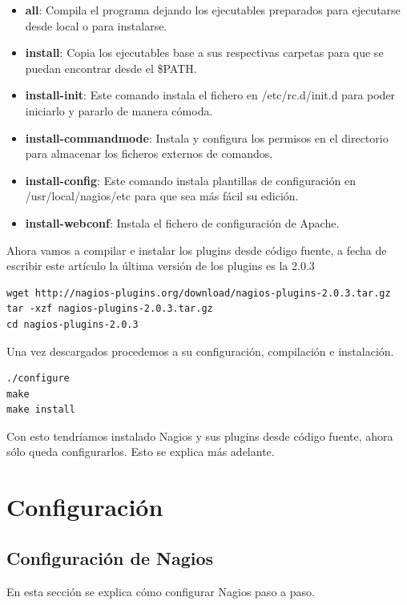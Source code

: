 \documentclass[11pt,a4paper]{article}
\begin{document}
\begin{itemize}
\item \textbf{all}: Compila el programa dejando los ejecutables preparados para ejecutarse desde local o para instalarse.
\item \textbf{install}: Copia los ejecutables base a sus respectivas carpetas para que se puedan encontrar desde el \$PATH.
\item \textbf{install-init}: Este comando instala el fichero en /etc/rc.d/init.d para poder iniciarlo y pararlo de manera cómoda.
\item \textbf{install-commandmode}: Instala y configura los permisos en el directorio para almacenar los ficheros externos de comandos.
\item \textbf{install-config}: Este comando instala plantillas de configuración en /usr/local/nagios/etc para que sea más fácil su edición.
\item \textbf{install-webconf}: Instala el fichero de configuración de Apache.
\end{itemize}

Ahora vamos a compilar e instalar los plugins desde código fuente, a fecha de escribir este artículo la última versión de los plugins es la 2.0.3

\begin{verbatim}
wget http://nagios-plugins.org/download/nagios-plugins-2.0.3.tar.gz
tar -xzf nagios-plugins-2.0.3.tar.gz
cd nagios-plugins-2.0.3
\end{verbatim}

Una vez descargados procedemos a su configuración, compilación e instalación.

\begin{verbatim}
./configure
make
make install
\end{verbatim}

Con esto tendríamos instalado Nagios y sus plugins desde código fuente, ahora sólo queda configurarlos. Esto se explica más adelante.

\section{Configuración}

\subsection{Configuración de Nagios}
En esta sección se explica cómo configurar Nagios paso a paso.
\\
\end{document}
